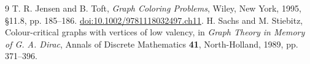 \documentclass[11pt]{article}
\begin{document}
\begin{thebibliography}{9}
T. R. Jensen and B. Toft, \emph{Graph Coloring Problems}, Wiley, New York, 1995, \S 11.8, pp. 185--186. \href{https://doi.org/10.1002/9781118032497.ch11}{doi:10.1002/9781118032497.ch11}.
H. Sachs and M. Stiebitz, Colour-critical graphs with vertices of low valency, in \emph{Graph Theory in Memory of G. A. Dirac}, Annals of Discrete Mathematics \textbf{41}, North-Holland, 1989, pp. 371--396.
\end{thebibliography}
\end{document}
